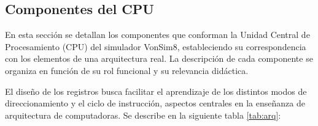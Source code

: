 \documentclass[12pt,oneside]{templates/unerthesis}
\begin{document}
\begin{table}[!h]
\centering
\caption{\label{tab:bloquesfuncionales}Bloques funcionales principales}
\centering
{}
\end{table}

\hypertarget{componentes-del-cpu}{%
\subsection{Componentes del CPU}\label{componentes-del-cpu}}

En esta sección se detallan los componentes que conforman la Unidad Central de Procesamiento (CPU) del simulador VonSim8, estableciendo su correspondencia con los elementos de una arquitectura real. La descripción de cada componente se organiza en función de su rol funcional y su relevancia didáctica.

El diseño de los registros busca facilitar el aprendizaje de los distintos modos de direccionamiento y el ciclo de instrucción, aspectos centrales en la enseñanza de arquitectura de computadoras. Se describe en la siguiente tabla \ref{tab:arq}:
\end{document}
